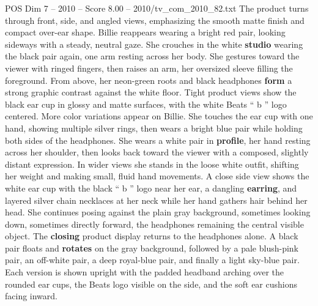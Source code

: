\begin{textsample}{POS Dim 7 – 2010 – Score 8.00 – 2010/tv\_com\_2010\_82.txt}
The product turns through front, side, and angled views, emphasizing the smooth matte finish and compact over-ear shape.
Billie reappears wearing a bright red pair, looking sideways with a steady, neutral gaze.
She crouches in the white \textbf{studio} wearing the black pair again, one arm resting across her body.
She gestures toward the viewer with ringed fingers, then raises an arm, her oversized sleeve filling the foreground.
From above, her neon-green roots and black headphones \textbf{form} a strong graphic contrast against the white floor.
Tight product views show the black ear cup in glossy and matte surfaces, with the white Beats “ b ” logo centered.
More color variations appear on Billie.
She touches the ear cup with one hand, showing multiple silver rings, then wears a bright blue pair while holding both sides of the headphones.
She wears a white pair in \textbf{profile}, her hand resting across her shoulder, then looks back toward the viewer with a composed, slightly distant expression.
In wider views she stands in the loose white outfit, shifting her weight and making small, fluid hand movements.
A close side view shows the white ear cup with the black “ b ” logo near her ear, a dangling \textbf{earring}, and layered silver chain necklaces at her neck while her hand gathers hair behind her head.
She continues posing against the plain gray background, sometimes looking down, sometimes directly forward, the headphones remaining the central visible object.
The \textbf{closing} product display returns to the headphones alone.
A black pair floats and \textbf{rotates} on the gray background, followed by a pale blush-pink pair, an off-white pair, a deep royal-blue pair, and finally a light sky-blue pair.
Each version is shown upright with the padded headband arching over the rounded ear cups, the Beats logo visible on the side, and the soft ear cushions facing inward.

\end{textsample}
